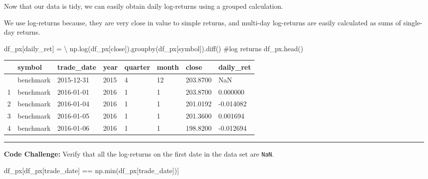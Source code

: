 \documentclass[
  letterpaper,
  DIV=11,
  numbers=noendperiod]{scrreprt}
\newenvironment{Shaded}{\begin{snugshade}}{\end{snugshade}}
\newcommand{\BuiltInTok}[1]{\textcolor[rgb]{0.00,0.23,0.31}{#1}}
\newcommand{\CommentTok}[1]{\textcolor[rgb]{0.37,0.37,0.37}{#1}}
\newcommand{\NormalTok}[1]{\textcolor[rgb]{0.00,0.23,0.31}{#1}}
\newcommand{\OperatorTok}[1]{\textcolor[rgb]{0.37,0.37,0.37}{#1}}
\newcommand{\StringTok}[1]{\textcolor[rgb]{0.13,0.47,0.30}{#1}}
\begin{document}
Now that our data is tidy, we can easily obtain daily log-returns using
a grouped calculation.

We use log-returns because, they are very close in value to simple
returns, and multi-day log-returns are easily calculated as sums of
single-day returns.

\begin{Shaded}
\begin{Highlighting}[]
\NormalTok{df\_px[}\StringTok{\textquotesingle{}daily\_ret\textquotesingle{}}\NormalTok{] }\OperatorTok{=} \OperatorTok{\textbackslash{}}
\NormalTok{    np.log(df\_px[}\StringTok{\textquotesingle{}close\textquotesingle{}}\NormalTok{]).groupby(df\_px[}\StringTok{\textquotesingle{}symbol\textquotesingle{}}\NormalTok{]).diff() }\CommentTok{\#log returns}
\NormalTok{df\_px.head()}
\end{Highlighting}
\end{Shaded}

\begin{longtable}[]{@{}llllllll@{}}
\toprule\noalign{}
& symbol & trade\_date & year & quarter & month & close & daily\_ret \\
\midrule\noalign{}
\endhead
\bottomrule\noalign{}
\endlastfoot
0 & benchmark & 2015-12-31 & 2015 & 4 & 12 & 203.8700 & NaN \\
1 & benchmark & 2016-01-01 & 2016 & 1 & 1 & 203.8700 & 0.000000 \\
2 & benchmark & 2016-01-04 & 2016 & 1 & 1 & 201.0192 & -0.014082 \\
3 & benchmark & 2016-01-05 & 2016 & 1 & 1 & 201.3600 & 0.001694 \\
4 & benchmark & 2016-01-06 & 2016 & 1 & 1 & 198.8200 & -0.012694 \\
\end{longtable}

\begin{center}\rule{0.5\linewidth}{0.5pt}\end{center}

\textbf{Code Challenge:} Verify that all the log-returns on the first
date in the data set are \texttt{NaN}.

\begin{Shaded}
\begin{Highlighting}[]
\NormalTok{df\_px[df\_px[}\StringTok{\textquotesingle{}trade\_date\textquotesingle{}}\NormalTok{] }\OperatorTok{==}\NormalTok{ np.}\BuiltInTok{min}\NormalTok{(df\_px[}\StringTok{\textquotesingle{}trade\_date\textquotesingle{}}\NormalTok{])]}
\end{Highlighting}
\end{Shaded}
\end{document}
